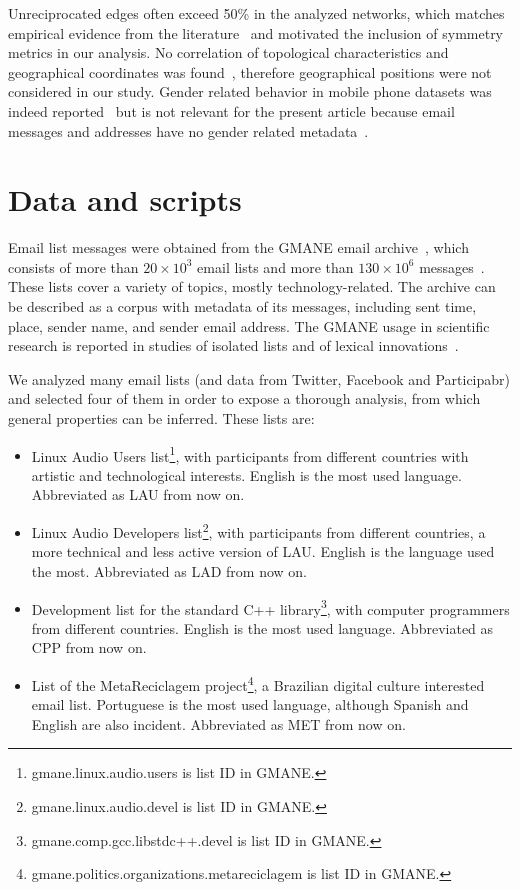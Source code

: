 \documentclass[%
	aip,
	jmp,%
	amsmath,amssymb,
	reprint,%
]{revtex4-1}
\begin{document}
Unreciprocated edges often exceed 50\% in the analyzed networks, which matches empirical evidence from the literature~\cite{newmanEvolving} and motivated the inclusion of symmetry metrics in our analysis. No correlation of topological characteristics and geographical coordinates was found~\cite{barabasiGeo}, therefore geographical positions were not considered in our study. Gender related behavior in mobile phone datasets was indeed reported~\cite{barabasiSex} but is not relevant for the present article because email messages and addresses have no gender related metadata~\cite{gmanePack}.


\section{Data and scripts}\label{sec:data}\label{scripts}

Email list messages were obtained from
the GMANE email archive~\cite{gmanePack}, which consists of more than $20\times 10^3$
email lists and more than $130\times 10^6$ messages~\cite{GMANEwikipedia}. These lists cover a variety of topics, mostly technology-related. The archive can be described as a corpus with metadata of its messages, including sent time, place, sender name, and sender email address.
The GMANE usage in scientific research is reported in studies of isolated lists and of lexical innovations~\cite{GMANE2,bird}. 

We analyzed many email lists (and data from Twitter, Facebook and Participabr)
and selected four of them in order to expose a thorough analysis,
from which general properties can be inferred. These lists are:
\begin{itemize}
	\item Linux Audio Users list\footnote{gmane.linux.audio.users is list ID in GMANE.},
		with participants from different countries with artistic and technological interests.
		English is the most used language. Abbreviated as LAU from now on.
	\item Linux Audio Developers list\footnote{gmane.linux.audio.devel is list ID in GMANE.},
		with participants from different countries,
		a more technical and less active version of LAU.
		English is the language used the most. 
		Abbreviated as LAD from now on.
	\item Development list for the standard C++ library\footnote{gmane.comp.gcc.libstdc++.devel is list ID in GMANE.},
		with computer programmers from different countries.
		English is the most used language.
		Abbreviated as CPP from now on.
	\item List of the MetaReciclagem project\footnote{gmane.politics.organizations.metareciclagem is list ID in GMANE.},
		a Brazilian digital culture interested email list.
		Portuguese is the most used language,
		although Spanish and English are also incident.
		Abbreviated as MET from now on.
\end{itemize} 
\end{document}
